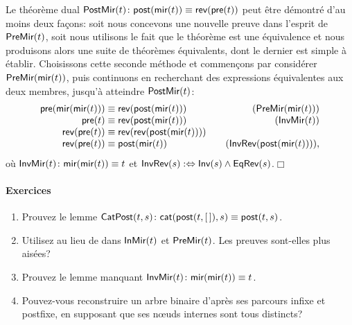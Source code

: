 Le théorème dual \(\textsf{PostMir}({t})
\colon \textsf{post}(\textsf{mir}(t)) \equiv
\textsf{rev}(\textsf{pre}(t))\)
 
 peut être démontré d'au moins deux façons:
soit nous concevons une nouvelle preuve dans l'esprit de
\(\textsf{PreMir}({t})\), soit nous utilisons le fait que le théorème est
une équivalence et nous produisons alors une suite de théorèmes
équivalents, dont le dernier est simple à établir. Choisissons cette
seconde méthode et commençons par considérer
\(\textsf{PreMir}({\textsf{mir}(t)})\),
puis continuons en recherchant des expressions équivalentes aux deux
membres, jusqu'à atteindre \(\textsf{PostMir}({t})\):
\begin{equation*}
\abovedisplayskip=0pt
\belowdisplayskip=0pt
\begin{array}{@{}r@{\;}c@{\;}l@{\qquad}r@{}}
          \fun{pre}(\fun{mir}(\fun{mir}(t)))
& \equiv
& \fun{rev}(\fun{post}(\fun{mir}(t)))
& (\pred{PreMir}{\fun{mir}(t)})\\
  \fun{pre}(t)
& \equiv
& \fun{rev}(\fun{post}(\fun{mir}(t)))
& (\pred{InvMir}{t})\\
  \fun{rev}(\fun{pre}(t))
& \equiv
& \fun{rev}(\fun{rev}(\fun{post}(\fun{mir}(t))))\\
  \fun{rev}(\fun{pre}(t))
& \equiv
& \fun{post}(\fun{mir}(t))
& (\pred{InvRev}{\fun{post}(\fun{mir}(t))}),
\end{array}
\end{equation*}
où \(\textsf{InvMir}({t}) \colon
\textsf{mir}(\textsf{mir}(t)) \equiv t\) et
\(\textsf{InvRev}({s}) :\Leftrightarrow \textsf{Inv}({s}) \wedge
\textsf{EqRev}({s})\).\hfill\(\Box\)

\paragraph{Exercices}
\nopagebreak
\begin{enumerate}

  \item Prouvez le lemme
  \(\textsf{CatPost}({t,s}) \colon \textsf{cat}(\textsf{post}(t,[\,]),s) \equiv
  \textsf{post}(t,s)\).

  \item Utilisez  au lieu de  dans
  \(\textsf{InMir}({t})\) et \(\textsf{PreMir}({t})\). Les preuves sont-elles
  plus aisées?

  \item Prouvez le lemme manquant
  \(\textsf{InvMir}({t}) \colon \textsf{mir}(\textsf{mir}(t)) \equiv
  t\).\label{ex_mir_mir}

\item Pouvez-vous reconstruire un arbre binaire d'après ses parcours
  infixe et postfixe, en supposant que ses nœuds internes sont
  tous distincts?

\end{enumerate}

